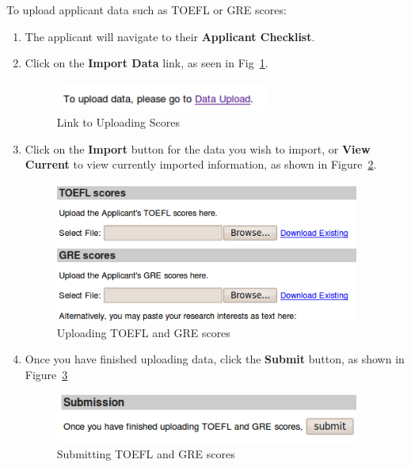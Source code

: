 \documentclass[titlepage]{article}
\begin{document}
To upload applicant data such as TOEFL or GRE scores:
\begin{enumerate}
 \item The applicant will navigate to their \textbf{\textsf{Applicant Checklist}}.
 \item Click on the \textbf{\textsf{Import Data}} link, as seen in Fig~\ref{nuploadlink}.
   \begin{figure}[h!]
     \begin{center}
       \includegraphics[width=7cm]{nuploadlink.png}
     \end{center}
     \caption{Link to Uploading Scores}
     \label{nuploadlink}
   \end{figure}
 \item Click on the \textbf{\textsf{Import}} button for the data you wish to import, or \textbf{\textsf{View Current}} to view currently imported information, as shown in Figure~\ref{nupload}.
   \begin{figure}[h!]
     \begin{center}
       \includegraphics[width=10cm]{nscores.png}
     \end{center}
     \caption{Uploading TOEFL and GRE scores}
     \label{nupload}
   \end{figure}

 \item Once you have finished uploading data, click the \textbf{\textsf{Submit}} button, as shown in Figure~\ref{nsubmitscores}

   \begin{figure}[h!]
     \begin{center}
       \includegraphics[width=10cm]{nsubmitscores.png}
     \end{center}
     \caption{Submitting TOEFL and GRE scores}
     \label{nsubmitscores}
   \end{figure}

\end{enumerate}
\end{document}
